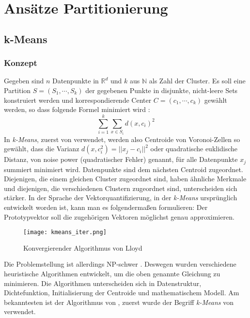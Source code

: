 \documentclass[a4paper,12pt,twoside]{article}
\newcommand{\Fachbegriff}[1]{\textit{#1}}
\begin{document}
\section{Ansätze Partitionierung}

\subsection{k-Means}

\subsubsection{Konzept}
Gegeben sind $n$ Datenpunkte in $\mathbb{R}^{d}$ und $k$ aus $\mathbb{N}$ als Zahl der Cluster. Es soll eine Partition $S=(S_1,\cdots,S_k)$ der gegebenen Punkte in disjunkte, nicht-leere Sets konstruiert werden und korrespondierende Center $C=(c_1,\cdots,c_k)$ gewählt werden, so dass folgende Formel minimiert wird \autocite{Arthur.}: 
\begin{equation}
\sum_{i=1}^{k} \sum_{x \in S_{i}} d(x,c_{i})^{2}
\end{equation}
In \Fachbegriff{k-Means}, zuerst von \autocite{MacQueen.1967} verwendet, werden also Centroide von Voronoi-Zellen so gewählt, dass die Varianz $d(x,c_{i}^{2})=||x_{j} - c_{i}||^{2}$ oder quadratische euklidische Distanz, von \textcite{Lloyd..1982} \glqq noise power \grqq (quadratischer Fehler) genannt, für alle Datenpunkte $x_{j}$ summiert minimiert wird. Datenpunkte sind dem nächsten Centroid zugeordnet. Diejenigen, die einem gleichen Cluster zugeordnet sind, haben ähnliche Merkmale und diejenigen, die verschiedenen Clustern zugeordnet sind, unterscheiden sich stärker. In der Sprache der Vektorquantifizierung, in der \Fachbegriff{k-Means} ursprünglich entwickelt worden ist, kann man es folgendermaßen formulieren: Der Prototypvektor soll die zugehörigen Vektoren möglichst genau approximieren.

\begin{figure}
	\centering
	\texttt{[image: kmeans\_iter.png]}
	\caption{Konvergierender Algorithmus von Lloyd}
	\label{img:kmeans_iter}
\end{figure}

Die Problemstellung ist allerdings NP-schwer \autocite{Mahajan.2009}. Deswegen wurden verschiedene heuristische Algorithmen entwickelt, um die oben genannte Gleichung zu minimieren. Die Algorithmen unterscheiden sich in Datenstruktur, Dichtefunktion, Initialisierung der Centroide und mathematischem Modell. Am bekanntesten ist der Algorithmus von \textcite{Lloyd..1982}, zuerst wurde der Begriff \Fachbegriff{k-Means} von \textcite{MacQueen.1967} verwendet. 
\end{document}
